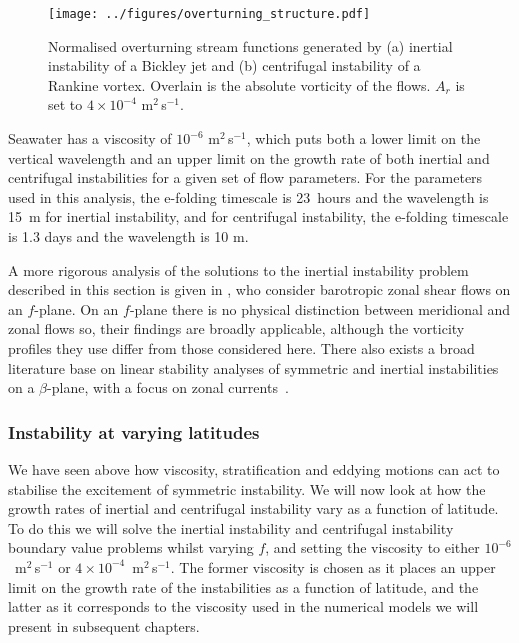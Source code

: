 \begin{figure}
    \centering
    \texttt{[image: ../figures/overturning\_structure.pdf]}
    \caption{Normalised overturning stream functions generated by (a) inertial instability of a Bickley jet and (b) centrifugal instability of a Rankine vortex. Overlain is the absolute vorticity of the flows. $A_r$ is set to $4 \times 10^{-4}$ m$^2\,$s$^{-1}$.}
    \label{fig:2DStructure}
\end{figure}

Seawater has a viscosity of $10^{-6}$ m$^{2}$\,s$^{-1}$, which puts both a lower limit on the vertical wavelength and an upper limit on the growth rate of both inertial and centrifugal instabilities for a given set of flow parameters. For the parameters used in this analysis, the e-folding timescale is 23~hours and the wavelength is 15~m for inertial instability, and for centrifugal instability, the e-folding timescale is 1.3 days and the wavelength is 10 m. 

A more rigorous analysis of the solutions to the inertial instability problem described in this section is given in \citet{Plougonven2009}, who consider barotropic zonal shear flows on an $f$-plane. On an $f$-plane there is no physical distinction between meridional and zonal flows so, their findings are broadly applicable, although the vorticity profiles they use differ from those considered here. There also exists a broad literature base on linear stability analyses of symmetric and inertial instabilities on a $\beta$-plane, with a focus on zonal currents~\citep[e.g.][]{Kloosterziel2017, Ribstein2014,Griffiths2003, Hua1997}.

\subsubsection{Instability at varying latitudes}
We have seen above how viscosity, stratification and eddying motions can act to stabilise the excitement of symmetric instability. We will now look at how the growth rates of inertial and centrifugal instability vary as a function of latitude. To do this we will solve the inertial instability and centrifugal instability boundary value problems whilst varying $f$, and setting the viscosity to either $10^{-6}$~m$^{2}\,$s$^{-1}$ or $4 \times 10^{-4}$~m$^{2}\,$s$^{-1}$. The former viscosity is chosen as it places an upper limit on the growth rate of the instabilities as a function of latitude, and the latter as it corresponds to the viscosity used in the numerical models we will present in subsequent chapters.

